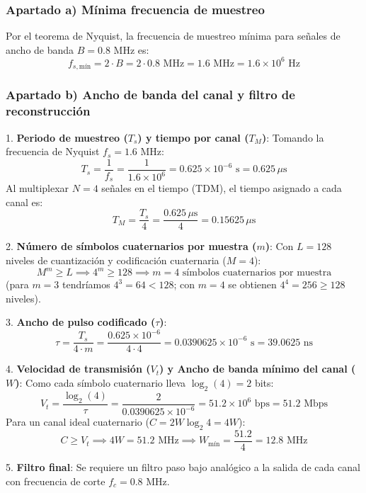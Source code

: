 \begin{resolucion}
\subsubsection*{Apartado a) Mínima frecuencia de muestreo}

Por el teorema de Nyquist, la frecuencia de muestreo mínima para señales de ancho de banda $B = 0.8$ MHz es:
\[
f_{s,\text{mín}} = 2 \cdot B = 2 \cdot 0.8 \text{ MHz} = 1.6 \text{ MHz} = 1.6 \times 10^6 \text{ Hz}
\]

\subsubsection*{Apartado b) Ancho de banda del canal y filtro de reconstrucción}

1. \textbf{Periodo de muestreo ($T_s$) y tiempo por canal ($T_M$)}:
   Tomando la frecuencia de Nyquist $f_s = 1.6$ MHz:
   \[
   T_s = \frac{1}{f_s} = \frac{1}{1.6 \times 10^6} = 0.625 \times 10^{-6} \text{ s} = 0.625 \, \mu\text{s}
   \]
   Al multiplexar $N=4$ señales en el tiempo (TDM), el tiempo asignado a cada canal es:
   \[
   T_M = \frac{T_s}{4} = \frac{0.625 \, \mu\text{s}}{4} = 0.15625 \, \mu\text{s}
   \]

2. \textbf{Número de símbolos cuaternarios por muestra ($m$)}:
   Con $L = 128$ niveles de cuantización y codificación cuaternaria ($M = 4$):
   \[
   M^m \ge L \implies 4^m \ge 128 \implies m = 4 \text{ símbolos cuaternarios por muestra}
   \]
   (para $m=3$ tendríamos $4^3 = 64 < 128$; con $m=4$ se obtienen $4^4 = 256 \ge 128$ niveles).

3. \textbf{Ancho de pulso codificado ($\tau$)}:
   \[
   \tau = \frac{T_s}{4 \cdot m} = \frac{0.625 \times 10^{-6}}{4 \cdot 4} = 0.0390625 \times 10^{-6} \text{ s} = 39.0625 \text{ ns}
   \]

4. \textbf{Velocidad de transmisión ($V_t$) y Ancho de banda mínimo del canal ($W$)}:
   Como cada símbolo cuaternario lleva $\log_2(4) = 2$ bits:
   \[
   V_t = \frac{\log_2(4)}{\tau} = \frac{2}{0.0390625 \times 10^{-6}} = 51.2 \times 10^6 \text{ bps} = 51.2 \text{ Mbps}
   \]
   Para un canal ideal cuaternario ($C = 2 W \log_2 4 = 4W$):
   \[
   C \ge V_t \implies 4W = 51.2 \text{ MHz} \implies W_{\text{mín}} = \frac{51.2}{4} = 12.8 \text{ MHz}
   \]

5. \textbf{Filtro final}:
   Se requiere un filtro paso bajo analógico a la salida de cada canal con frecuencia de corte $f_c = 0.8$ MHz.


\end{resolucion}
